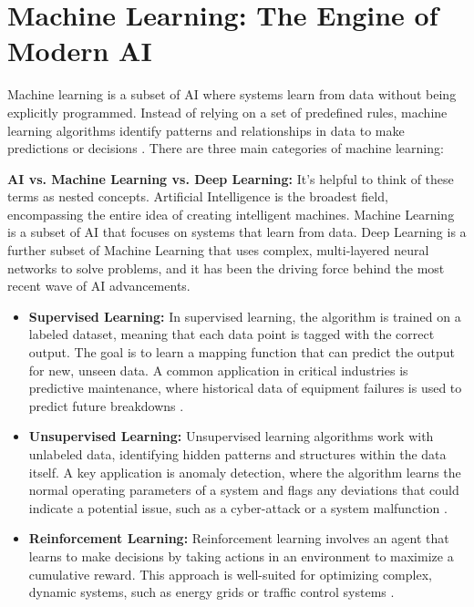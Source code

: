 \section{Machine Learning: The Engine of Modern AI}
\label{sec:machine_learning}
Machine learning is a subset of AI where systems learn from data without being explicitly programmed. Instead of relying on a set of predefined rules, machine learning algorithms identify patterns and relationships in data to make predictions or decisions \parencite{Samuel1959}. There are three main categories of machine learning:

\begin{note}
\textbf{AI vs. Machine Learning vs. Deep Learning:} It's helpful to think of these terms as nested concepts. Artificial Intelligence is the broadest field, encompassing the entire idea of creating intelligent machines. Machine Learning is a subset of AI that focuses on systems that learn from data. Deep Learning is a further subset of Machine Learning that uses complex, multi-layered neural networks to solve problems, and it has been the driving force behind the most recent wave of AI advancements.
\end{note}

\begin{itemize}
    \item \textbf{Supervised Learning:} In supervised learning, the algorithm is trained on a labeled dataset, meaning that each data point is tagged with the correct output. The goal is to learn a mapping function that can predict the output for new, unseen data. A common application in critical industries is predictive maintenance, where historical data of equipment failures is used to predict future breakdowns \parencite{Sarker2021}.
    \item \textbf{Unsupervised Learning:} Unsupervised learning algorithms work with unlabeled data, identifying hidden patterns and structures within the data itself. A key application is anomaly detection, where the algorithm learns the normal operating parameters of a system and flags any deviations that could indicate a potential issue, such as a cyber-attack or a system malfunction \parencite{Chandola2009}.
    \item \textbf{Reinforcement Learning:} Reinforcement learning involves an agent that learns to make decisions by taking actions in an environment to maximize a cumulative reward. This approach is well-suited for optimizing complex, dynamic systems, such as energy grids or traffic control systems \parencite{SuttonBarto2018}.
\end{itemize}

